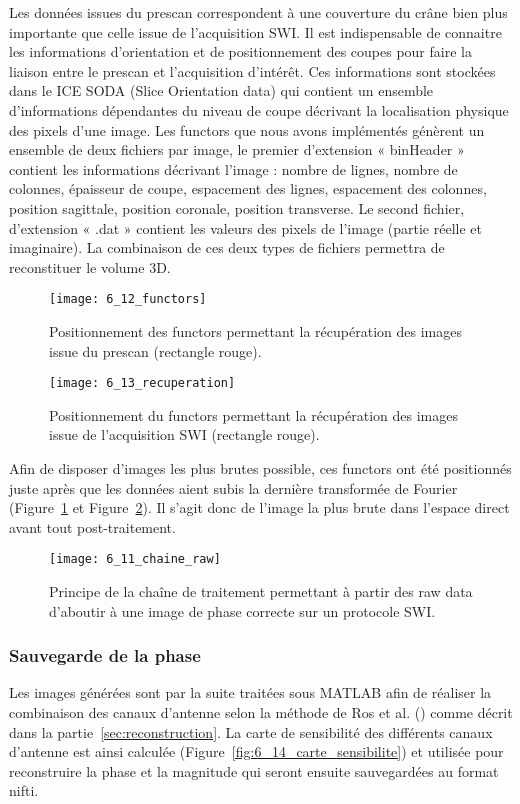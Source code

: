 {Les données issues du prescan correspondent à une couverture du crâne bien plus importante
que celle issue de l’acquisition SWI. Il est indispensable de connaitre les informations d’orientation et
de positionnement des coupes pour faire la liaison entre le prescan et l’acquisition d’intérêt. Ces
informations sont stockées dans le ICE SODA (Slice Orientation data) qui contient un ensemble
d’informations dépendantes du niveau de coupe décrivant la localisation physique des pixels d’une
image. Les functors que nous avons implémentés génèrent un ensemble de deux fichiers par image, le
premier d’extension « binHeader » contient les informations décrivant l’image : nombre de lignes,
nombre de colonnes, épaisseur de coupe, espacement des lignes, espacement des colonnes, position
sagittale, position coronale, position transverse. Le second fichier, d’extension « .dat » contient les valeurs des pixels de l’image (partie réelle et imaginaire). La combinaison de ces deux types de fichiers permettra de reconstituer le volume 3D.

\begin{figure}[!t]
\centering
\texttt{[image: 6\_12\_functors]}
\caption{Positionnement des functors permettant la récupération des images issue du prescan (rectangle rouge).}
\label{fig:6_12_functors}	
\end{figure}
\begin{figure}[!t]
\centering
\texttt{[image: 6\_13\_recuperation]}
\caption{Positionnement du functors permettant la récupération des images issue de l’acquisition SWI (rectangle rouge).}
\label{fig:6_13_recuperation}	
\end{figure}

Afin de disposer d’images les plus brutes possible, ces functors ont été positionnés juste après
que les données aient subis la dernière transformée de Fourier (Figure~\ref{fig:6_12_functors} et Figure~\ref{fig:6_13_recuperation}). Il s’agit donc
de l’image la plus brute dans l’espace direct avant tout post-traitement.


\begin{figure}[!b]
\centering
\texttt{[image: 6\_11\_chaine\_raw]}
\caption{Principe de la chaîne de traitement permettant à partir des raw data d’aboutir à une image de phase correcte sur
un protocole SWI.}
\label{fig:6_11_chaine_raw}	
\end{figure}

\subsubsection{Sauvegarde de la phase}
Les images générées sont par la suite traitées sous MATLAB afin de réaliser la combinaison des
canaux d’antenne selon la méthode de Ros et al. (\cite{Ros2009}) comme décrit dans la partie~\ref{sec:reconstruction}. La carte de
sensibilité des différents canaux d’antenne est ainsi calculée (Figure~\ref{fig:6_14_carte_sensibilite}) et utilisée pour reconstruire
la phase et la magnitude qui seront ensuite sauvegardées au format nifti.

}
